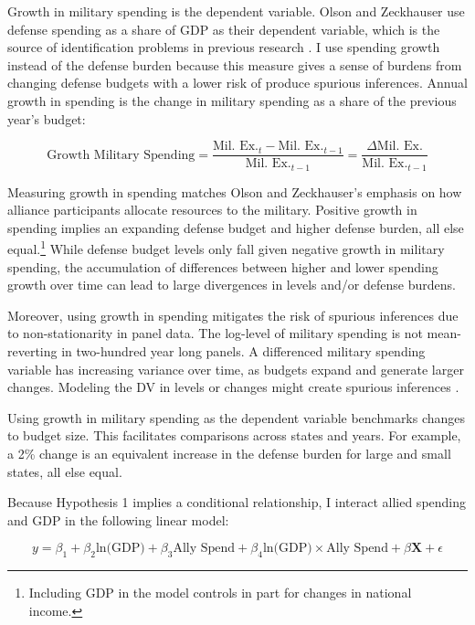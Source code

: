 \documentclass[12pt]{article}
\begin{document}
Growth in military spending is the dependent variable. 
Olson and Zeckhauser use defense spending as a share of GDP as their dependent variable, which is the source of identification problems in previous research \citep{Kronmal1993, PluemperNeumayer2015}. 
I use spending growth instead of the defense burden because this measure gives a sense of burdens from changing defense budgets with a lower risk of produce spurious inferences. 
Annual growth in spending is the change in military spending as a share of the previous year's budget:


\begin{equation}
\mbox{Growth Military Spending} = \frac{\mbox{Mil. Ex.}_t - \mbox{Mil. Ex.}_{t-1} }{ \mbox{Mil. Ex.}_{t-1} } = \frac{\Delta \mbox{Mil. Ex.} }{ \mbox{Mil. Ex.}_{t-1} }
\end{equation} 


Measuring growth in spending matches Olson and Zeckhauser's emphasis on how alliance participants allocate resources to the military.
Positive growth in spending implies an expanding defense budget and higher defense burden, all else equal.\footnote{Including GDP in the model controls in part for changes in national income.} 
While defense budget levels only fall given negative growth in military spending, the accumulation of differences between higher and lower spending growth over time can lead to large divergences in levels and/or defense burdens. 


Moreover, using growth in spending mitigates the risk of spurious inferences due to non-stationarity in panel data. 
The log-level of military spending is not mean-reverting in two-hundred year long panels.
A differenced military spending variable has increasing variance over time, as budgets expand and generate larger changes. 
Modeling the DV in levels or changes might create spurious inferences \citep{GrangerNewbold1974}. 


Using growth in military spending as the dependent variable benchmarks changes to budget size. 
This facilitates comparisons across states and years. 
For example, a 2\% change is an equivalent increase in the defense burden for large and small states, all else equal. 


Because Hypothesis 1 implies a conditional relationship, I interact allied spending and GDP in the following linear model:

\begin{equation} 
y = \beta_1 + \beta_2 \mbox{ln(GDP)} + \beta_3 \mbox{Ally Spend} + \beta_4 \mbox{ln(GDP)} \times \mbox{Ally Spend} + \beta \mathbf{X} + \epsilon
\end{equation}
\end{document}
